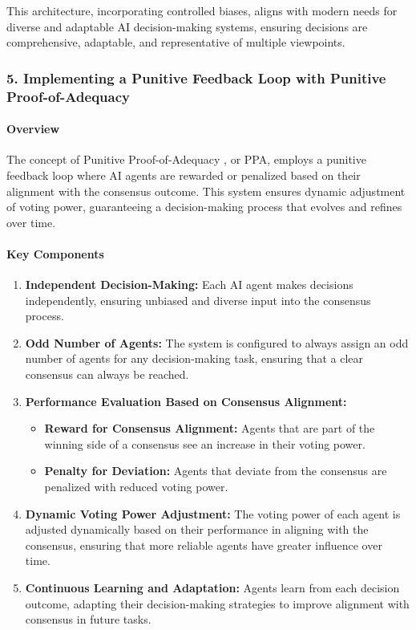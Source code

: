 This architecture, incorporating controlled biases, aligns with modern
needs for diverse and adaptable AI decision-making systems, ensuring
decisions are comprehensive, adaptable, and representative of multiple
viewpoints.

\hypertarget{implementing-a-punitive-feedback-loop-with-punitive-proof-of-adequacy}{%
\subsubsection{5. Implementing a Punitive Feedback Loop with Punitive
Proof-of-Adequacy}\label{implementing-a-punitive-feedback-loop-with-punitive-proof-of-adequacy}}

\hypertarget{overview-1}{%
\paragraph{Overview}\label{overview-1}}

The concept of Punitive Proof-of-Adequacy , or PPA, employs a punitive
feedback loop where AI agents are rewarded or penalized based on their
alignment with the consensus outcome. This system ensures dynamic
adjustment of voting power, guaranteeing a decision-making process that
evolves and refines over time.

\hypertarget{key-components}{%
\paragraph{Key Components}\label{key-components}}

\begin{enumerate}
\def\labelenumi{\arabic{enumi}.}
\item
  \textbf{Independent Decision-Making:} Each AI agent makes decisions
  independently, ensuring unbiased and diverse input into the consensus
  process.
\item
  \textbf{Odd Number of Agents:} The system is configured to always
  assign an odd number of agents for any decision-making task, ensuring
  that a clear consensus can always be reached.
\item
  \textbf{Performance Evaluation Based on Consensus Alignment:}

  \begin{itemize}
  \tightlist
  \item
    \textbf{Reward for Consensus Alignment:} Agents that are part of the
    winning side of a consensus see an increase in their voting power.
  \item
    \textbf{Penalty for Deviation:} Agents that deviate from the
    consensus are penalized with reduced voting power.
  \end{itemize}
\item
  \textbf{Dynamic Voting Power Adjustment:} The voting power of each
  agent is adjusted dynamically based on their performance in aligning
  with the consensus, ensuring that more reliable agents have greater
  influence over time.
\item
  \textbf{Continuous Learning and Adaptation:} Agents learn from each
  decision outcome, adapting their decision-making strategies to improve
  alignment with consensus in future tasks.
\end{enumerate}

